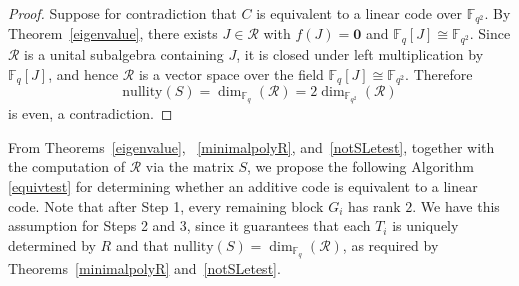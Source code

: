 \documentclass[a4paper,12pt]{article}
\theoremstyle{plain}
\theoremstyle{definition}
\begin{document}
\begin{proof}
Suppose for contradiction that $C$ is equivalent to a linear code over $\mathbb{F}_{q^2}$. 
By Theorem~\ref{eigenvalue}, there exists $J \in \mathcal{R}$ with $f(J) = \mathbf{0}$ and $\mathbb{F}_q[J] \cong \mathbb{F}_{q^2}$. 
Since $\mathcal{R}$ is a unital subalgebra containing $J$, it is closed under left multiplication by $\mathbb{F}_q[J]$, and hence $\mathcal{R}$ is a vector space over the field $\mathbb{F}_q[J] \cong \mathbb{F}_{q^2}$. 
Therefore
\[
\mathrm{nullity}(S) = \dim_{\mathbb{F}_q}(\mathcal{R}) = 2 \dim_{\mathbb{F}_{q^2}}(\mathcal{R})
\]
is even, a contradiction.
\end{proof}



















 

 From Theorems~\ref{eigenvalue}, ~\ref{minimalpolyR}, and~\ref{notSLetest}, together with the computation of $\mathcal{R}$ via the matrix $S$, we propose the following Algorithm \ref{equivtest} for determining whether an additive code is equivalent to a linear code. 
 Note that after Step 1, every remaining block $G_i$ has rank $2$. 
 We have this assumption for  Steps 2 and 3, since it guarantees that each $T_i$ is uniquely determined by $R$ and that $\mathrm{nullity}(S)=\dim_{\mathbb{F}_q}(\mathcal{R})$, as required by Theorems~\ref{minimalpolyR} and~\ref{notSLetest}.
\end{document}
